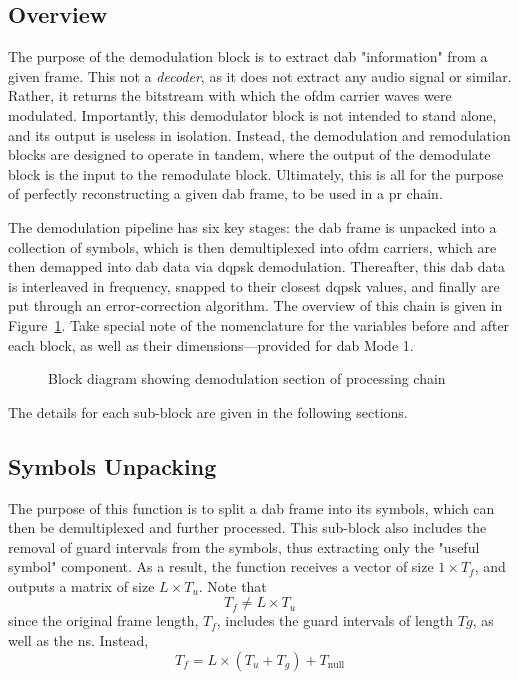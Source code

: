 \documentclass[class=report,11pt,crop=false]{standalone}
\begin{document}
\subsection{Overview}
The purpose of the demodulation block is to extract \gls{dab} "information" from a given frame. This not a \emph{decoder}, as it does not extract any audio signal or similar. Rather, it returns the bitstream with which the \gls{ofdm} carrier waves were modulated. Importantly, this demodulator block is not intended to stand alone, and its output is useless in isolation. Instead, the demodulation and remodulation blocks are designed to operate in tandem, where the output of the demodulate block is the input to the remodulate block. Ultimately, this is all for the purpose of perfectly reconstructing a given \gls{dab} frame, to be used in a \gls{pr} chain.

The demodulation pipeline has six key stages: the \gls{dab} frame is unpacked into a collection of symbols, which is then demultiplexed into \gls{ofdm} carriers, which are then demapped into \gls{dab} data via \gls{dqpsk} demodulation. Thereafter, this \gls{dab} data is interleaved in frequency, snapped to their closest \gls{dqpsk} values, and finally are put through an error-correction algorithm. The overview of this chain is given in Figure~\ref{fig:BD_Demod_All}. Take special note of the nomenclature for the variables before and after each block, as well as their dimensions---provided for \gls{dab} Mode 1.

\begin{figure}[htbp]
    \centering
    \captionsetup{type=figure}
    \def\svgwidth{\linewidth}
    { %
        }
    \caption{Block diagram showing demodulation section of processing chain}
    \label{fig:BD_Demod_All}
\end{figure}

The details for each sub-block are given in the following sections.

\subsection{Symbols Unpacking \label{subsect:dab-proc_symbols-unpack}}
The purpose of this function is to split a \gls{dab} frame into its symbols, which can then be demultiplexed and further processed. This sub-block also includes the removal of guard intervals from the symbols, thus extracting only the "useful symbol" component. As a result, the function receives a vector of size \(1\times T_f\), and outputs a matrix of size \(L\times T_u\). Note that
\begin{equation}
  T_f \ne L\times T_u
\end{equation}
since the original frame length, \(T_f\), includes the guard intervals of length \(Tg\), as well as the \gls{ns}. Instead,
\begin{equation}
  T_f = L\times (T_u + T_g) + T_\mathrm{null}
\end{equation}
\end{document}
